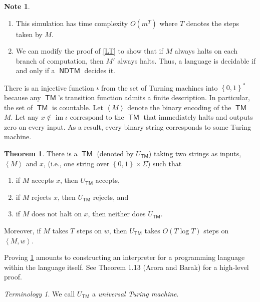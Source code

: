 \documentclass[10pt,letterpaper,cm]{nupset}
\theoremstyle{definition}
\newtheorem{note}[definition]{Note}
\theoremstyle{theorem}
\newtheorem{theorem}[definition]{Theorem}
\theoremstyle{remark}
\newtheorem*{term}{Terminology}
\newcommand{\1}{\mathbf{1}}
\newcommand{\0}{\vec 0}
\DeclareMathOperator{\im}{im}
\DeclareMathOperator{\TM}{\mathsf{TM}}
\DeclareMathOperator{\NDTM}{\mathsf{NDTM}}
\begin{document}
\begin{note} $ $
\begin{enumerate}
\item This simulation has time complexity $O(m^T)$ where $T$ denotes the steps taken by $M$.
\item We can modify the proof of \cref{LT} to show that if $M$ always halts on each branch of computation, then $M'$ always halts. Thus, a language is decidable if and only if a $\NDTM$ decides it.
\end{enumerate}
\end{note}

\medskip

There is an injective function $\iota$ from the set of Turning machines into $\left\{0,1\right\}^{\ast}$ because any $\TM$'s transition function admits a finite description. In particular, the set of $\TM$ is countable. Let $\left\langle M \right\rangle $ denote the binary encoding of the $\TM$ $M$. Let any $x\notin \im{\iota}$ correspond to the $\TM$ that immediately halts and outputs zero on every input. As a result, every binary string corresponds to some Turing machine. 

\smallskip

\begin{theorem}\label{UTM}
 There is a $\TM$ (denoted by $U_{\TM}$) taking two strings as inputs, $\left\langle M \right\rangle$ and $x$, (i.e., one string over $\left\{0,1\right\} \times \Sigma$) such that
 \begin{enumerate}[label=(\alph*)]
 \item if $M$ accepts $x$, then $U_{\TM}$ accepts,
 \item if $M$ rejects $x$, then $U_{\TM}$ rejects, and
 \item if $M$ does not halt on $x$, then neither does $U_{\TM}$.
 \end{enumerate} Moreover, if $M$ takes $T$ steps on $w$, then $U_{\TM}$ takes $O(T \log{T})$ steps on $\left\langle M, w \right\rangle$.
\end{theorem}

Proving \cref{UTM} amounts to constructing an interpreter for a programming language within the language itself. See Theorem 1.13 (Arora and Barak) for a high-level proof.

\begin{term}
We call $U_{\TM}$ a \textit{universal Turing machine}.
\end{term}

\medskip
\end{document}
